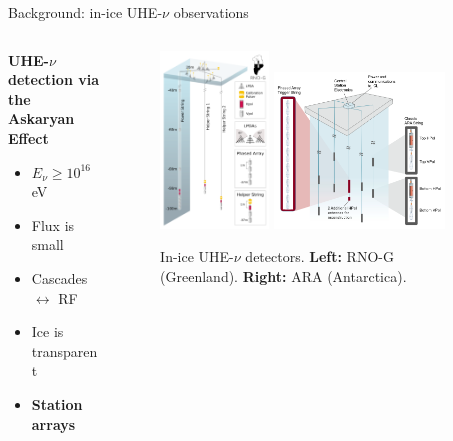\documentclass{beamer}
\begin{document}
\begin{frame}{Background: in-ice UHE-$\nu$ observations}
\small
\begin{columns}[T]
\begin{column}{0.32\textwidth}
\textbf{\alert{UHE-$\nu$ detection via the Askaryan Effect}}
\begin{itemize}
\item $E_{\nu} \geq 10^{16}$ eV
\item Flux is small
\item Cascades $\leftrightarrow$ RF
\item Ice is transparent
\item \textbf{Station arrays}
\end{itemize}
\end{column}
\begin{column}{0.68\textwidth}
\begin{figure}
\centering
\includegraphics[width=0.35\textwidth]{RNO-G.png} \hspace{0.5cm}
\includegraphics[width=0.55\textwidth]{ARA.png}
\caption{\footnotesize In-ice UHE-$\nu$ detectors. \textbf{Left:} RNO-G (Greenland). \textbf{Right:} ARA (Antarctica).}
\end{figure}
\end{column}
\end{columns}
\end{frame}
\end{document}

